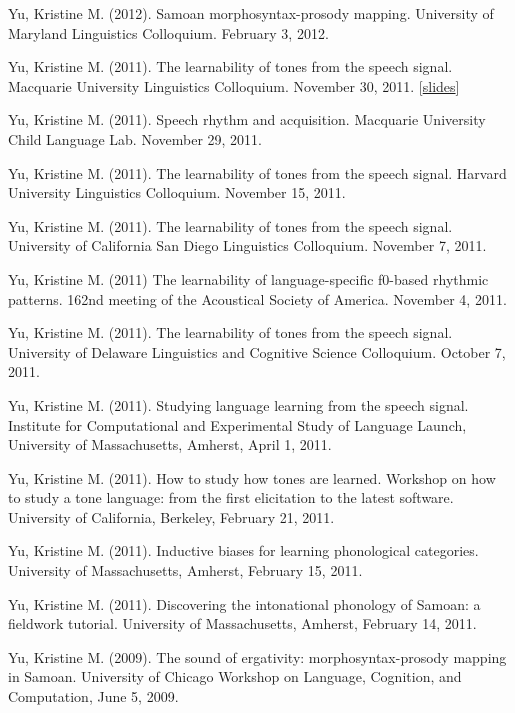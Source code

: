 \documentclass[10pt]{article}
\begin{document}
\begin{bibenum}
    \item Yu, Kristine M. (2012). Samoan morphosyntax-prosody
      mapping. University of Maryland Linguistics Colloquium. February
      3, 2012.

    \item Yu, Kristine M. (2011). The learnability of tones from the
      speech signal. Macquarie University Linguistics
      Colloquium. November 30, 2011. [\href{https://speakerdeck.com/krisyu/the-learnability-of-the-tones-from-the-speech-signal}{slides}]

    \item Yu, Kristine M. (2011). Speech rhythm and
      acquisition. Macquarie University Child Language Lab. November 29, 2011. 

    \item Yu, Kristine M. (2011). The learnability of tones from the
      speech signal. Harvard University Linguistics
      Colloquium. November 15, 2011.

    \item Yu, Kristine M. (2011). The learnability of tones from the
      speech signal. University of California San Diego Linguistics
      Colloquium. November 7, 2011. 

    \item Yu, Kristine M. (2011) The learnability of language-specific
      f0-based rhythmic patterns. 162nd meeting of the Acoustical
      Society of America. November 4, 2011. 

    \item Yu, Kristine M. (2011). The learnability of tones from the
      speech signal. University of Delaware Linguistics and Cognitive
      Science Colloquium. October 7, 2011. 

    \item Yu, Kristine M. (2011). Studying language learning from the
      speech signal. Institute for Computational and Experimental
      Study of Language Launch, University of Massachusetts, Amherst, April 1, 2011.

    \item Yu, Kristine M. (2011). How to study how tones are learned. Workshop on how to
      study a tone language: from the first elicitation to the latest
      software. University of California, Berkeley, February 21, 2011.

    \item Yu, Kristine M. (2011). Inductive biases for learning
      phonological categories. University of Massachusetts, Amherst, February 15, 2011. 

    \item Yu, Kristine M. (2011). Discovering the intonational
      phonology of Samoan: a fieldwork tutorial. University of
      Massachusetts, Amherst, February 14, 2011.  

    \item Yu, Kristine M. (2009). The sound of ergativity: morphosyntax-prosody mapping in
      Samoan. University of Chicago Workshop on Language, Cognition,
      and Computation, June 5, 2009.

\end{bibenum}
\end{document}
